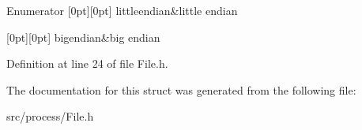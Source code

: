 \begin{DoxyEnumFields}{Enumerator}
[0pt][0pt]{}\mbox{\label{struct_file_1_1_endianess_ac80818ac42fdd0c9aa29d424e65fa37ea3cb0abec70bab3c0e492ef9b57d4f4da}} 
littleendian&little endian \\
\hline

[0pt][0pt]{}\mbox{\label{struct_file_1_1_endianess_ac80818ac42fdd0c9aa29d424e65fa37ea7dcfb82e9bd382f1eab49a0d48993944}} 
bigendian&big endian \\
\hline

\end{DoxyEnumFields}


Definition at line 24 of file File.\+h.



The documentation for this struct was generated from the following file\+:\begin{DoxyCompactItemize}
\item 
src/process/File.\+h\end{DoxyCompactItemize}

